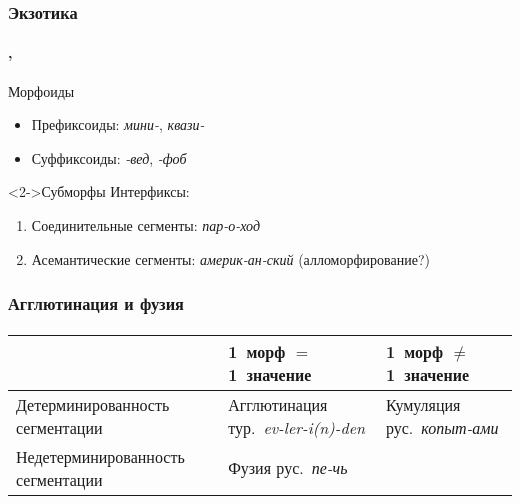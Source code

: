 \begin{frame}
    \frametitle{Экзотика}
    \framesubtitle{\autocite[91--97]{plungyan:2003}, \autocite[15, 102]{zubova_menshikova:2014}}

    \begin{block}{Морфоиды}
        \begin{itemize}
            \item Префиксоиды: \textit{мини-}, \textit{квази-}
            \item Суффиксоиды: \textit{-вед}, \textit{-фоб}
        \end{itemize}
    \end{block}

    \begin{block}<2->{Субморфы}
        Интерфиксы: \begin{enumerate}
            \item Соединительные сегменты: \textit{пар-о-ход}
            \item Асемантические сегменты: \textit{америк-ан-ский} (алломорфирование?)
        \end{enumerate}
    \end{block}
\end{frame}

\begin{frame}
    \frametitle{Агглютинация и фузия}
    \framesubtitle{\autocites[201--202]{lyons}[40--46, 62--67]{plungyan:2003}}

    \begin{table}
        \begin{tabularx}{\textwidth}{XXX}
             & 1~морф $=$ 1~значение & 1~морф $\neq$ 1~значение \\ \midrule \midrule
            Детерминированность \linebreak сегментации
                & Агглютинация \linebreak тур.\ \textit{ev-ler-i(n)-den}
                & Кумуляция \linebreak рус.\ \textit{копыт-ами} \\ \midrule
            Недетерминированность \linebreak сегментации
                & Фузия \linebreak рус.\ \textit{пе-чь} \textit & \\
        \end{tabularx}
    \end{table}
\end{frame}
